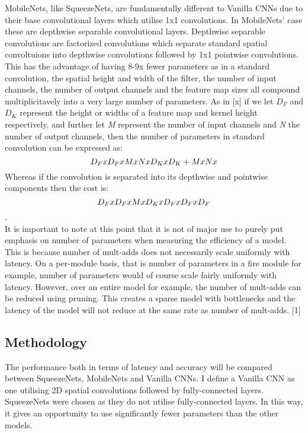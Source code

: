 \documentclass{article}
\begin{document}
MobileNets, like SqueezeNets, are fundamentally different to Vanilla CNNs due to their base convolutional layers which utilise 1x1 convolutions. In MobileNets' case these are depthwise separable convolutional layers. Depthwise separable convolutions are factorized convolutions which separate standard spatial convoltuions into depthwise convolutions followed by 1x1 pointwise convolutions.\\

This has the advantage of having 8-9x fewer parameters as in a standard convolution, the spatial height and width of the filter, the number of input channels, the number of output channels and the feature map sizes all compound multiplicitavely into a very large number of parameters. As in [x] if we let \emph{$D_{F}$} and \emph{$D_{K}$} represent the height or widths of a feature map and kernel height respectively, and further let \emph{M} represent the number of input channels and \emph{N} the number of output channels, then the number of parameters in standard convolution can be expressed as: \[\emph{$D_{F}$} x \emph{$D_{F}$} x M x N x \emph{$D_{K}$} x \emph{$D_{K}$} + M x N x \] Whereas if the convolution is separated into its depthwise and pointwise components then the cost is: \[\emph{$D_{F}$} x \emph{$D_{F}$} x M x \emph{$D_{K}$} x \emph{$D_{F}$} x \emph{$D_{F}$} x \emph{$D_{F}$}\].\\

It is important to note at this point that it is not of major use to purely put emphasis on number of parameters when measuring the efficiency of a model. This is because number of mult-adds does not necessarily scale uniformly with latency. On a per-module basis, that is number of parameters in a fire module for example, number of parameters would of course scale fairly uniformly with latency. However, over an entire model for example, the number of mult-adds can be reduced using pruning. This creates a sparse model with bottlenecks and the latency of the model will not reduce at the same rate as number of mult-adds. [1] \\


\subsection*{Methodology}
The performance both in terms of latency and accuracy will be compared between SqueezeNets, MobileNets and Vanilla CNNs. I define a Vanilla CNN as one utilising 2D spatial convolutions followed by fully-connected layers. SqueezeNets were chosen as they do not utilise fully-connected layers. In this way, it gives an opportunity to use significantly fewer parameters than the other models.\\
\end{document}
